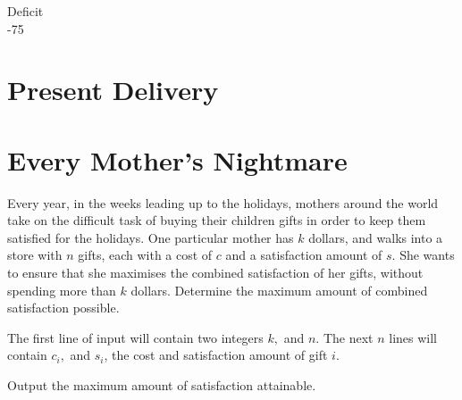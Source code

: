 \documentclass{problem-set}
\begin{document}
{
Deficit \\
-75
}

\newpage
\section{Present Delivery}

\newpage
\section{Every Mother's Nightmare}
Every year, in the weeks leading up to the holidays, mothers around the world take on the difficult task of buying their children gifts in order to keep them satisfied for the holidays. One particular mother has $k$ dollars, and walks into a store with $n$ gifts, each with a cost of $c$ and a satisfaction amount of $s$. She wants to ensure that she maximises the combined satisfaction of her gifts, without spending more than $k$ dollars. Determine the maximum amount of combined satisfaction possible.

The first line of input will contain two integers $k,$ and $n$. The next $n$ lines will contain $c_i,$ and $s_i$, the cost and satisfaction amount of gift $i$.

\outputformat
Output the maximum amount of satisfaction attainable.




\end{document}
